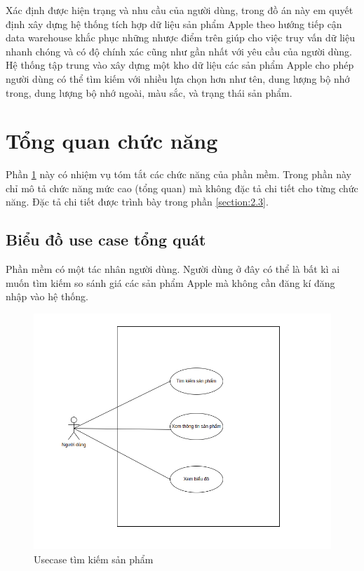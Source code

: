 \documentclass[../DoAn.tex]{subfiles}
\begin{document}
Xác định được hiện trạng và nhu cầu của người dùng, trong đồ án này em quyết định xây dựng hệ thống tích hợp dữ liệu sản phẩm Apple theo hướng tiếp cận data warehouse khắc phục những nhược điểm trên giúp cho việc truy vấn dữ liệu nhanh chóng và có độ chính xác cũng như gần nhất với yêu cầu của người dùng. Hệ thống tập trung vào xây dựng một kho dữ liệu các sản phẩm Apple cho phép người dùng có thể tìm kiếm với nhiều lựa chọn hơn như tên, dung lượng bộ nhớ trong, dung lượng bộ nhớ ngoài, màu sắc, và trạng thái sản phẩm.

\section{Tổng quan chức năng}
\label{section:2.2}
Phần \ref{section:2.2} này có nhiệm vụ tóm tắt các chức năng của phần mềm. Trong phần này chỉ mô tả chức năng mức cao (tổng quan) mà không đặc tả chi tiết cho từng chức năng. Đặc tả chi tiết được trình bày trong phần \ref{section:2.3}.

\subsection{Biểu đồ use case tổng quát}
\label{subsection:2.2.1}
Phần mềm có một tác nhân người dùng. Người dùng ở đây có thể là bất kì ai muốn tìm kiếm so sánh giá các sản phẩm Apple mà không cần đăng kí đăng nhập vào hệ thống.

\begin{figure}[H]
    \centering
    \includegraphics[scale=.6]{Hinhve/usecase.png}
    \caption{Usecase tìm kiếm sản phẩm}
    \label{fig:my_label2}
\end{figure}
\end{document}
